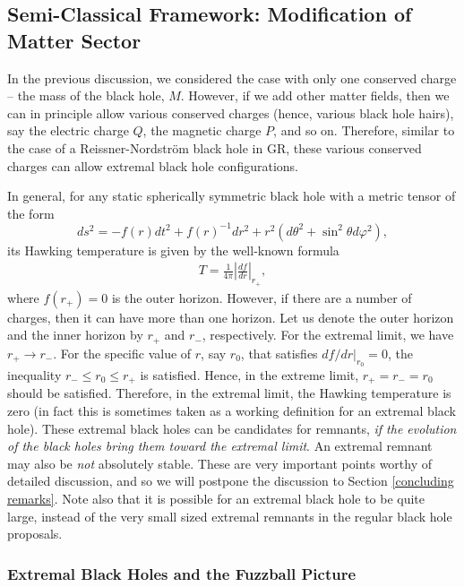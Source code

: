 \documentclass[12pt]{article}
\newcommand{\2}{$^2$}
\newcommand{\3}{$^3$}
\newcommand{\4}{$_4$}
\newcommand{\5}{$_5$}
\begin{document}
\subsection{Semi-Classical Framework: Modification of Matter Sector}

In the previous discussion, we considered the case with only one conserved charge -- the mass of the black hole, $M$. However, if we add other matter fields, then we can in principle allow various conserved charges (hence, various black hole hairs), say the electric charge $Q$, the magnetic charge $P$, and so on. Therefore, similar to the case of a Reissner-Nordstr\"om black hole in GR, these various conserved charges can allow extremal black hole configurations.



In general, for any static spherically symmetric black hole with a metric tensor of the form
\begin{equation}
ds^2 = -f(r) dt^2 + f(r)^{-1}dr^2 + r^2(d\theta^2 + \sin^2\theta d\varphi^2),
\end{equation}
its Hawking temperature is given by the well-known formula
\begin{eqnarray}
T = \frac{1}{4\pi} \left|\frac{df}{dr}\right|_{r_{+}},
\end{eqnarray}
where $f(r_{+}) = 0$ is the outer horizon. However, if there are a number of charges, then it can have more than one horizon. Let us denote the outer horizon and the inner horizon by $r_{+}$ and $r_{-}$, respectively. For the extremal limit, we have $r_{+} \to r_{-}$. For the specific value of $r$, say $r_{0}$, that satisfies $df/dr|_{r_{0}} = 0$, the inequality $r_{-} \leqslant r_{0} \leqslant r_{+}$ is satisfied. Hence, in the extreme limit, $r_{+} = r_{-} = r_{0}$ should be satisfied. Therefore, in the extremal limit, the Hawking temperature is zero (in fact this is sometimes taken as a working definition for an extremal black hole). These extremal black holes can be candidates for remnants, \emph{if the evolution of the black holes bring them toward the extremal limit}. An extremal remnant may also be \emph{not} absolutely stable. These are very important points worthy of detailed discussion, and so we will postpone the discussion to Section \ref{concluding remarks}. 
Note also that it is possible for an extremal black hole to be quite large, instead of the very small sized extremal remnants in the regular black hole proposals.

\subsubsection{Extremal Black Holes and the Fuzzball Picture}
\end{document}
